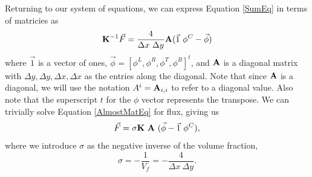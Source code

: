 \documentclass[11pt,letterpaper,oneside,notitlepage]{article}	%
\newcommand{\eq}[1]{Equation \eqref{#1}}		%
\numberwithin{equation}{section}				%
\begin{document}
Returning to our system of equations, we can express \eq{SumEq} in terms of matricies as
\begin{equation}
{\bf K}^{-1} \vec F =\frac{4}{\Delta x\ \Delta y} {\bf A}(\vec 1\ \phi^C-\vec\phi) \label{AlmostMatEq}
\end{equation}
where $\vec 1$ is a vector of ones, $\vec\phi=[\phi^L,\phi^R,\phi^T,\phi^B]^t$, and $\bf A$ is a diagonal matrix with $\Delta y, \Delta y, \Delta x, \Delta x$ as the entries along the diagonal. Note that since $\bf A$ is a diagonal, we will use the notation $A^i = {\bf A}_{i,i}$ to refer to a diagonal value. Also note that the superscript $t$ for the $\phi$ vector represents the transpose. We can trivially solve \eq{AlmostMatEq} for flux, giving us
\begin{equation}
\vec F =\sigma{\bf K}\ {\bf A}\ (\vec\phi - \vec1\ \phi^C )\label{FluxEqn},
\end{equation}
where we introduce $\sigma$ as the negative inverse of the volume fraction, 
\begin{equation}
\sigma = -\frac{1}{V_f} = -\frac{4}{\Delta x\ \Delta y}
.\end{equation}
\end{document}
